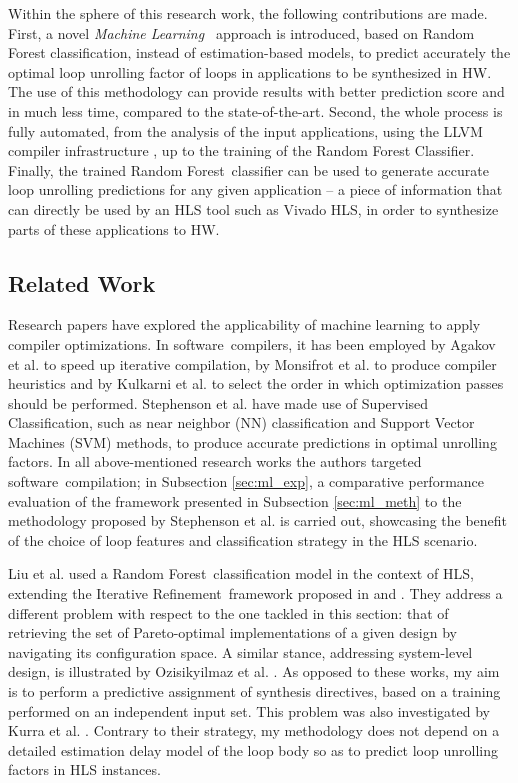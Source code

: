\documentclass[]{usiinfthesis}
\newcommand{\SW}{{software}}
\newcommand{\SoTA}{{state-of-the-art}}
\newcommand{\ML}{{Machine Learning}}
\newcommand{\RF}{{Random Forest}}
\newcommand{\ItRef}{{Iterative Refinement}}
\begin{document}
Within the sphere of this research work, the following contributions are made.
First, a novel {\em \ML\ }
approach is introduced, based on Random Forest classification, 
instead of estimation-based models, to predict 
accurately the optimal loop unrolling factor of loops in applications to be synthesized
in HW. The use of this methodology can provide results with better prediction score
and in much less time, compared to the \SoTA.
Second, the whole process is fully automated, from the analysis of the input applications, 
using the LLVM compiler infrastructure \cite{LattnerMar04}, up to the training of the Random 
Forest Classifier. Finally, the trained \RF\ classifier can be used to generate accurate loop 
unrolling predictions for any given application -- a piece of information that can 
directly be used by an HLS tool such as Vivado HLS, in order to synthesize parts of these 
applications to HW.

\subsection{Related Work}

Research papers have explored the applicability of machine learning to apply
compiler optimizations. In \SW\ compilers, it has been
employed by Agakov et al. \cite{AgakovMar06} to speed up iterative compilation,
by Monsifrot et al. \cite{MonsifrotAug02} to produce compiler heuristics
and by Kulkarni et al. \cite{KulkarniOct12} to select the order in which optimization passes
should be performed. Stephenson et al. \cite{StephensonApr05} have made use of Supervised 
Classification, such as near neighbor (NN) classification 
and Support Vector Machines (SVM) methods, to produce accurate predictions in optimal unrolling 
factors.
In all above-mentioned research works the authors targeted \SW\ 
compilation; in Subsection \ref{sec:ml_exp}, a comparative performance evaluation of the 
framework presented in Subsection \ref{sec:ml_meth} to the methodology proposed by 
Stephenson et al. is carried out, showcasing the benefit of the choice of loop features and 
classification strategy in the HLS scenario.\par

Liu et al.  \cite{LiuJun13} used a \RF\
classification model in the context of HLS, extending the \ItRef\
framework proposed in \cite{MarianiApr12} \cite{PalermoNov09}
\cite{XydisMar13} and \cite{ZuluagaJun12}. They address a different
problem with respect to the one tackled in this section: that of retrieving the set of
Pareto-optimal implementations of a given design by navigating its
configuration space. A similar stance, addressing system-level design,
is illustrated by Ozisikyilmaz et al. \cite{OzisikyilmazJun08}.  As
opposed to these works, my aim is to perform a predictive assignment
of synthesis directives, based on a training performed on an independent
input set. This problem was also investigated by Kurra et
al. \cite{KurraApr07}. Contrary to their strategy, my methodology does not
depend on a detailed estimation delay model of the loop body so as to
predict loop unrolling factors in HLS instances.
\end{document}
